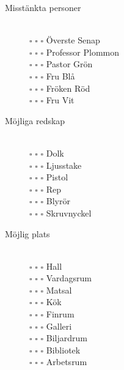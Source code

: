 \documentclass[a5paper,10pt]{article}
\begin{document}
\pagestyle{empty}

\newenvironment{categories} {
\newcommand{\cat}[1]{ \item[ {\large ##1} ] }
\newcommand{\sub}[1]{ \hfill \\ {\small $\square$ $\square$ $\square$ ##1} }
    \begin{description}
}{
    \end{description}
}

\begin{categories}
\cat{Misstänkta personer}
\sub{Överste Senap}
\sub{Professor Plommon}
\sub{Pastor Grön}
\sub{Fru Blå}
\sub{Fröken Röd}
\sub{Fru Vit}

\cat{Möjliga redskap}
\sub{Dolk}
\sub{Ljusstake}
\sub{Pistol}
\sub{Rep}
\sub{Blyrör}
\sub{Skruvnyckel}

\cat{Möjlig plats}
\sub{Hall}
\sub{Vardagsrum}
\sub{Matsal}
\sub{Kök}
\sub{Finrum}
\sub{Galleri}
\sub{Biljardrum}
\sub{Bibliotek}
\sub{Arbetsrum}
\end{categories}
\end{document}
